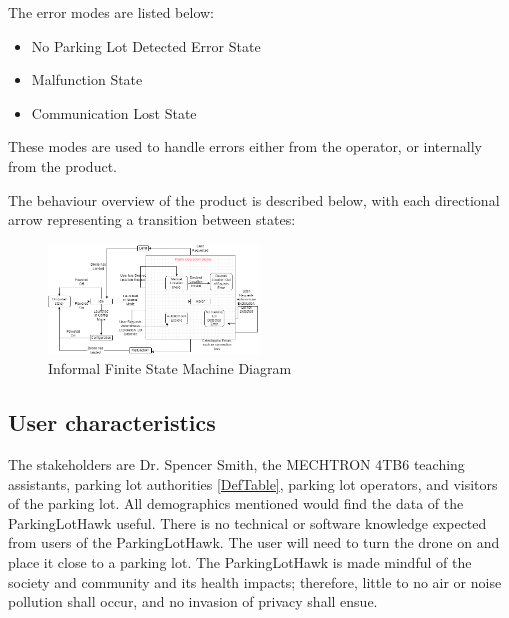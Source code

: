 \documentclass{article}
\begin{document}
The error modes are listed below:
\begin{itemize}
    \item No Parking Lot Detected Error State
    \item Malfunction State
    \item Communication Lost State
\end{itemize}
These modes are used to handle errors either from the operator, or internally from the product. 

The behaviour overview of the product is described below, with each directional arrow representing a transition between states:
\begin{figure}[h!]
  \begin{center} 
  \caption{Informal Finite State Machine Diagram } 
  \label{InfFSM}
 
        \includegraphics[width=0.5\textwidth]{InformalFSM.png}
  \end{center}
\end{figure}

\subsection{User characteristics}
The stakeholders are Dr. Spencer Smith, the MECHTRON 4TB6 teaching assistants, parking lot authorities \ref{DefTable}, parking lot operators, and visitors of the parking lot. All demographics mentioned would find the data of the ParkingLotHawk useful. There is no technical or software knowledge expected from users of the ParkingLotHawk. The user will need to turn the drone on and place it close to a parking lot.  The ParkingLotHawk is made mindful of the society and community and its health impacts; therefore, little to no air or noise pollution shall occur, and no invasion of privacy shall ensue.
\end{document}
